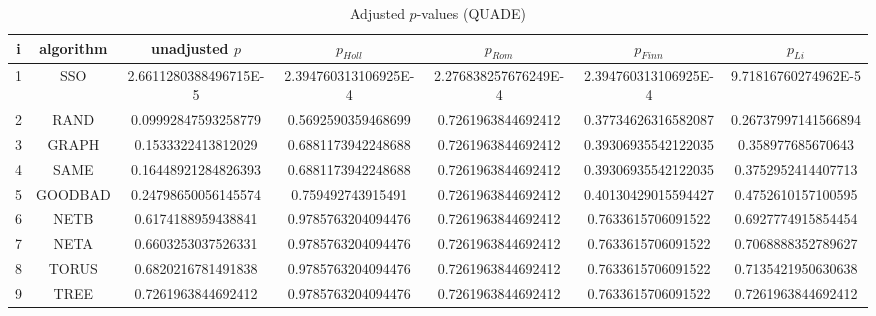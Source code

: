 \documentclass[a4paper,10pt]{article}
\begin{document}
\begin{landscape}
\begin{table}[!htp]
\centering\scriptsize
\caption{Adjusted $p$-values (QUADE)}
\begin{tabular}{ccccccc}
i&algorithm&unadjusted $p$&$p_{Holl}$&$p_{Rom}$&$p_{Finn}$&$p_{Li}$\\
\hline
1& SSO&2.6611280388496715E-5&2.394760313106925E-4&2.276838257676249E-4&2.394760313106925E-4&9.71816760274962E-5\\
2& RAND&0.09992847593258779&0.5692590359468699&0.7261963844692412&0.37734626316582087&0.26737997141566894\\
3& GRAPH&0.1533322413812029&0.6881173942248688&0.7261963844692412&0.39306935542122035&0.358977685670643\\
4& SAME&0.16448921284826393&0.6881173942248688&0.7261963844692412&0.39306935542122035&0.3752952414407713\\
5& GOODBAD&0.24798650056145574&0.759492743915491&0.7261963844692412&0.40130429015594427&0.4752610157100595\\
6& NETB&0.6174188959438841&0.9785763204094476&0.7261963844692412&0.7633615706091522&0.6927774915854454\\
7& NETA&0.6603253037526331&0.9785763204094476&0.7261963844692412&0.7633615706091522&0.7068888352789627\\
8& TORUS&0.6820216781491838&0.9785763204094476&0.7261963844692412&0.7633615706091522&0.7135421950630638\\
9& TREE&0.7261963844692412&0.9785763204094476&0.7261963844692412&0.7633615706091522&0.7261963844692412\\
\hline
\end{tabular}
\end{table}

\end{landscape}
\end{document}
